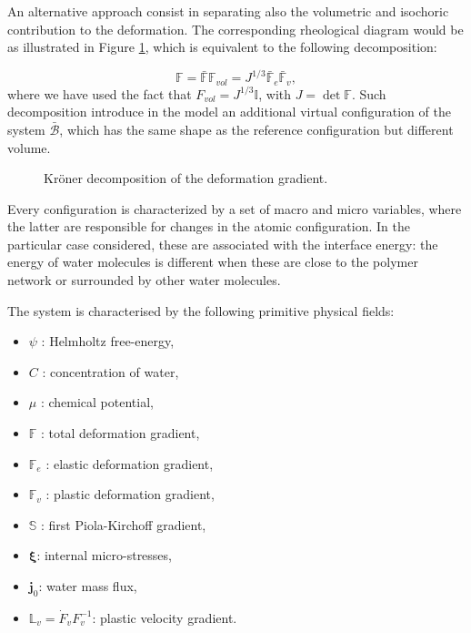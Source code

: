 \documentclass[12pt]{extarticle}
\newcommand{\F}{\ensuremath{\mathbb{F}}}
\newcommand{\LL}{\ensuremath{\mathbb{L}}}
\begin{document}
An alternative approach consist in separating also the volumetric and isochoric contribution to the deformation. The corresponding rheological diagram would be as illustrated in Figure \ref{Model2}, which is equivalent to the following decomposition:

\begin{equation}
\F= \bar{\F} \F_{vol}= J^{1/3} \bar{\F}_e \bar{\F}_v,
\end{equation}
where we have used the fact that $F_{vol}=J^{1/3}\mathbb{I}$, with $J=\det \F$. Such decomposition introduce in the model an additional virtual configuration of the system $\bar{\mathcal{B}}$, which has the same shape as the reference configuration but different volume. 

\begin{figure}[h!]
	\hspace{10mm}
	\def\svgwidth{1\linewidth}
	
	\caption{Kr\"{o}ner decomposition of the deformation gradient.}
	\label{Model2}
\end{figure}

Every configuration is characterized by a set of macro and micro variables, where the latter are responsible for changes in the atomic configuration. In the particular case considered, these are associated with the interface energy: the energy of water molecules is different when these are close to the polymer network or surrounded by other water molecules. 

The system is characterised by the following primitive physical fields: 
\begin{itemize}
	\item $\psi$ : Helmholtz free-energy,
	\item $C$ : concentration of water,
	\item $\mu$ : chemical potential,
	\item $\F$ : total deformation gradient,
	\item $\F_e$ : elastic deformation gradient,
	\item $\F_v$ : plastic deformation gradient,
	\item $\mathbb{S}$ : first Piola-Kirchoff gradient,
	\item $\boldsymbol{\xi}$: internal micro-stresses,
	\item $\mathbf{j}_0$: water mass flux,
	\item $\LL_v=\dot{F}_vF^{-1}_v$: plastic velocity gradient.
\end{itemize} 
\end{document}
